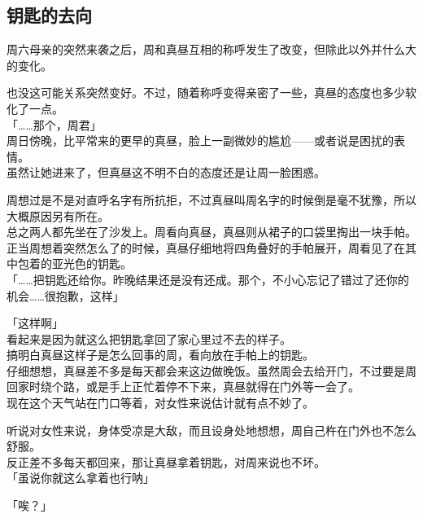 \subsection{钥匙的去向}

周六母亲的突然来袭之后，周和真昼互相的称呼发生了改变，但除此以外并什么大的变化。

也没这可能关系突然变好。不过，随着称呼变得亲密了一些，真昼的态度也多少软化了一点。\\

「……那个，周君」\\

周日傍晚，比平常来的更早的真昼，脸上一副微妙的尴尬——或者说是困扰的表情。\\

虽然让她进来了，但真昼这不明不白的态度还是让周一脸困惑。

周想过是不是对直呼名字有所抗拒，不过真昼叫周名字的时候倒是毫不犹豫，所以大概原因另有所在。\\

总之两人都先坐在了沙发上。周看向真昼，真昼则从裙子的口袋里掏出一块手帕。\\

正当周想着突然怎么了的时候，真昼仔细地将四角叠好的手帕展开，周看见了在其中包着的亚光色的钥匙。\\

「……把钥匙还给你。昨晚结果还是没有还成。那个，不小心忘记了错过了还你的机会……很抱歉，这样」

「这样啊」\\

看起来是因为就这么把钥匙拿回了家心里过不去的样子。\\

搞明白真昼这样子是怎么回事的周，看向放在手帕上的钥匙。\\

仔细想想，真昼差不多是每天都会来这边做晚饭。虽然周会去给开门，不过要是周回家时绕个路，或是手上正忙着停不下来，真昼就得在门外等一会了。\\

现在这个天气站在门口等着，对女性来说估计就有点不妙了。

听说对女性来说，身体受凉是大敌，而且设身处地想想，周自己杵在门外也不怎么舒服。\\

反正差不多每天都回来，那让真昼拿着钥匙，对周来说也不坏。\\

「虽说你就这么拿着也行呐」

「唉？」

